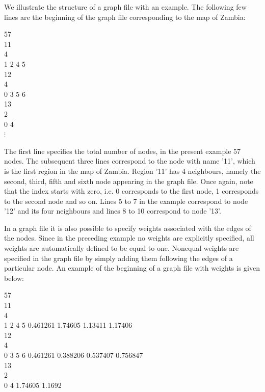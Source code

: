 \documentclass[a4paper]{article}
\begin{document}
We illustrate the structure of a graph file with an example. The
following few lines are the beginning
of the graph file corresponding to the map of Zambia: \\

\footnotesize

 57\\
 11\\
 4\\
 1 2 4 5\\
 12\\
 4\\
 0 3 5 6\\
 13\\
 2\\
 0 4\\

\hspace{1cm} $\vdots$

\normalsize

\vspace{0.5cm}

The first line specifies the total number of nodes, in the present
example 57 nodes. The subsequent three lines correspond to the
node with name '11', which is the first region in the map of
Zambia. Region '11' has 4 neighbours, namely the second, third,
fifth and sixth node appearing in the graph file. Once again, note
that the index starts with zero, i.e. 0 corresponds to the first
node, 1 corresponds to the second node and so on. Lines 5 to 7 in
the example correspond to node '12' and its four neighbours and
lines 8 to 10 correspond to node '13'.

In a graph file it is also possible to specify weights associated
with the edges of the nodes. Since in the preceding example no
weights are explicitly specified, all weights are automatically
defined to be equal to one. Nonequal weights are specified in the
graph file by simply adding them following the edges of a
particular node.
An example of the beginning of a graph file with weights is given below: \\

\footnotesize

 57\\
 11\\
 4\\
 1 2 4 5 0.461261 1.74605 1.13411 1.17406\\
 12\\
 4\\
 0 3 5 6 0.461261 0.388206 0.537407 0.756847\\
 13\\
 2\\
 0 4 1.74605 1.1692\\
\end{document}

